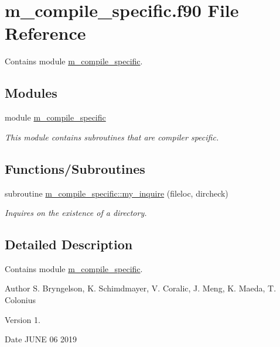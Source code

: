 \hypertarget{m__compile__specific_8f90}{}\section{m\+\_\+compile\+\_\+specific.\+f90 File Reference}
\label{m__compile__specific_8f90}


Contains module \hyperlink{namespacem__compile__specific}{m\+\_\+compile\+\_\+specific}.  


\subsection*{Modules}
\begin{DoxyCompactItemize}
\item 
module \hyperlink{namespacem__compile__specific}{m\+\_\+compile\+\_\+specific}
\begin{DoxyCompactList}\small\item\em This module contains subroutines that are compiler specific. \end{DoxyCompactList}\end{DoxyCompactItemize}
\subsection*{Functions/\+Subroutines}
\begin{DoxyCompactItemize}
\item 
subroutine \hyperlink{namespacem__compile__specific_aa7f14da74305c1d061ce326b16a3263e}{m\+\_\+compile\+\_\+specific\+::my\+\_\+inquire} (fileloc, dircheck)
\begin{DoxyCompactList}\small\item\em Inquires on the existence of a directory. \end{DoxyCompactList}\end{DoxyCompactItemize}


\subsection{Detailed Description}
Contains module \hyperlink{namespacem__compile__specific}{m\+\_\+compile\+\_\+specific}. 

\begin{DoxyAuthor}{Author}
S. Bryngelson, K. Schimdmayer, V. Coralic, J. Meng, K. Maeda, T. Colonius 
\end{DoxyAuthor}
\begin{DoxyVersion}{Version}
1. 
\end{DoxyVersion}
\begin{DoxyDate}{Date}
J\+U\+NE 06 2019 
\end{DoxyDate}
